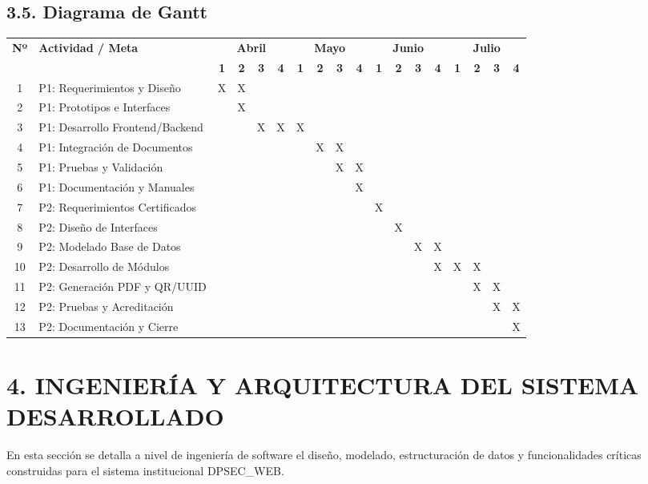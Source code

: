 \documentclass[11pt,a4paper]{article}
\begin{document}
\subsection*{3.5. Diagrama de Gantt}
\noindent
\begin{center}
\scriptsize
\setlength{\tabcolsep}{2pt}
\begin{tabular}{|c|p{4.2cm}|c|c|c|c|c|c|c|c|c|c|c|c|c|c|c|c|}
\hline
\multirow{2}{*}{\textbf{Nº}} & \multirow{2}{*}{\textbf{Actividad / Meta}} & \multicolumn{4}{c|}{\textbf{Abril}} & \multicolumn{4}{c|}{\textbf{Mayo}} & \multicolumn{4}{c|}{\textbf{Junio}} & \multicolumn{4}{c|}{\textbf{Julio}} \tabularnewline
\cline{3-18}
& & \textbf{1} & \textbf{2} & \textbf{3} & \textbf{4} & \textbf{1} & \textbf{2} & \textbf{3} & \textbf{4} & \textbf{1} & \textbf{2} & \textbf{3} & \textbf{4} & \textbf{1} & \textbf{2} & \textbf{3} & \textbf{4} \tabularnewline
\hline
1 & P1: Requerimientos y Diseño & X & X & & & & & & & & & & & & & & \tabularnewline
\hline
2 & P1: Prototipos e Interfaces & & X & & & & & & & & & & & & & & \tabularnewline
\hline
3 & P1: Desarrollo Frontend/Backend & & & X & X & X & & & & & & & & & & & \tabularnewline
\hline
4 & P1: Integración de Documentos & & & & & & X & X & & & & & & & & & \tabularnewline
\hline
5 & P1: Pruebas y Validación & & & & & & & X & X & & & & & & & & \tabularnewline
\hline
6 & P1: Documentación y Manuales & & & & & & & & X & & & & & & & & \tabularnewline
\hline
7 & P2: Requerimientos Certificados & & & & & & & & & X & & & & & & & \tabularnewline
\hline
8 & P2: Diseño de Interfaces & & & & & & & & & & X & & & & & & \tabularnewline
\hline
9 & P2: Modelado Base de Datos & & & & & & & & & & & X & X & & & & \tabularnewline
\hline
10 & P2: Desarrollo de Módulos & & & & & & & & & & & & X & X & X & & \tabularnewline
\hline
11 & P2: Generación PDF y QR/UUID & & & & & & & & & & & & & & X & X & \tabularnewline
\hline
12 & P2: Pruebas y Acreditación & & & & & & & & & & & & & & & X & X \tabularnewline
\hline
13 & P2: Documentación y Cierre & & & & & & & & & & & & & & & & X \tabularnewline
\hline
\end{tabular}
\end{center}

\newpage

\section*{4. INGENIERÍA Y ARQUITECTURA DEL SISTEMA DESARROLLADO}
En esta sección se detalla a nivel de ingeniería de software el diseño, modelado, estructuración de datos y funcionalidades críticas construidas para el sistema institucional DPSEC\_WEB.
\end{document}
